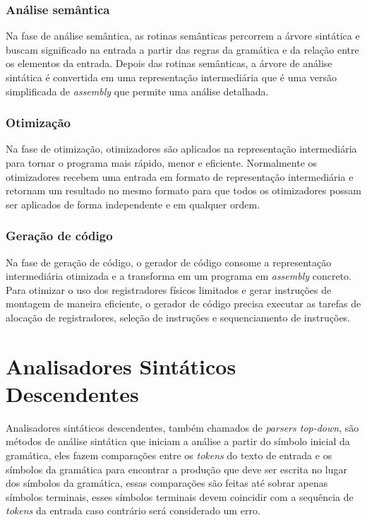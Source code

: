 \subsubsection{Análise semântica}
Na fase de análise semântica, as rotinas semânticas percorrem a árvore sintática e buscam significado na entrada a partir das regras da gramática e da relação entre os elementos da entrada. Depois das rotinas semânticas, a árvore de análise sintática é convertida em uma representação intermediária que é uma versão simplificada de \textit{assembly} que permite uma análise detalhada.

\subsubsection{Otimização}
Na fase de otimização, otimizadores são aplicados na representação intermediária para tornar o programa mais rápido, menor e eficiente. Normalmente os otimizadores recebem uma entrada em formato de representação intermediária e retornam um resultado no mesmo formato para que todos os otimizadores possam ser aplicados de forma independente e em qualquer ordem.

\subsubsection{Geração de código}
Na fase de geração de código, o gerador de código consome a representação intermediária otimizada e a transforma em um programa em \textit{assembly} concreto. Para otimizar o uso dos registradores físicos limitados e gerar instruções de montagem de maneira eficiente, o gerador de código precisa executar as tarefas de alocação de registradores, seleção de instruções e sequenciamento de instruções.

\section{Analisadores Sintáticos Descendentes}
Analisadores sintáticos descendentes, também chamados de \textit{parsers top-down}, são métodos de análise sintática que iniciam a análise a partir do símbolo inicial da gramática, eles fazem comparações entre os \textit{tokens} do texto de entrada e os símbolos da gramática para encontrar a produção que deve ser escrita no lugar dos símbolos da gramática, essas comparações são feitas até sobrar apenas símbolos terminais, esses símbolos terminais devem coincidir com a sequência de \textit{tokens} da entrada caso contrário será considerado um erro.

